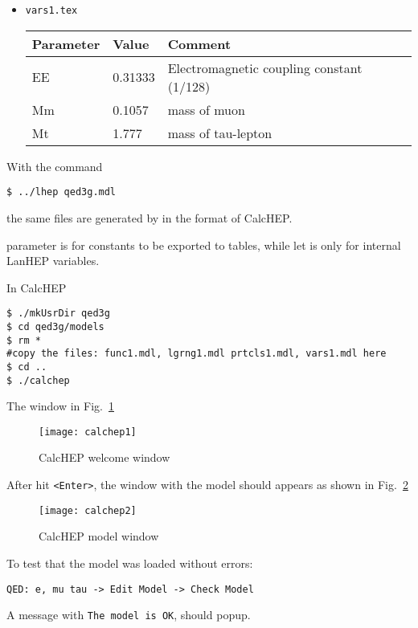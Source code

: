 \begin{frame}{}
\begin{itemize}
\item \lstinline{vars1.tex}
  \begin{center}
    \begin{tabular}{|l|l|l|} \hline
Parameter & Value & Comment \\ \hline
EE    &0.31333             &Electromagnetic coupling constant (1/128) \\
Mm    &0.1057              &mass of muon \\
Mt    &1.777               &mass of tau-lepton \\ \hline
\end{tabular}
  \end{center}
\end{itemize}

With the command
\begin{lstlisting}
$ ../lhep qed3g.mdl
\end{lstlisting}
the same files are generated by in the format of CalcHEP.

parameter is for constants to be exported to tables, while let is only for internal LanHEP variables.

In CalcHEP
\begin{lstlisting}
$ ./mkUsrDir qed3g
$ cd qed3g/models
$ rm *
#copy the files: func1.mdl, lgrng1.mdl prtcls1.mdl, vars1.mdl here
$ cd ..
$ ./calchep
\end{lstlisting}
The window in Fig.~\ref{fig:calchep1}
\begin{figure}
  \centering
  \texttt{[image: calchep1]}
  \caption{CalcHEP welcome window}
  \label{fig:calchep1}
\end{figure}
After hit \lstinline{<Enter>}, the window with the model should appears as shown in Fig.~\ref{fig:calchep2}
\begin{figure}
  \centering
  \texttt{[image: calchep2]}
  \caption{CalcHEP model window}
  \label{fig:calchep2}
\end{figure}
To test that the model was loaded without errors:
\begin{lstlisting}
QED: e, mu tau -> Edit Model -> Check Model
\end{lstlisting}
A message with \lstinline{The model is OK}, should popup.


\end{frame}
